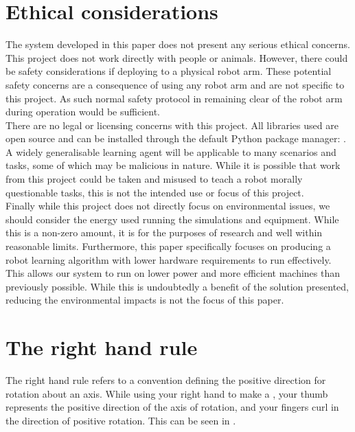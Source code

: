 \appendix
\chapter{Ethical considerations}
\label{apx:ethics}
The system developed in this paper does not present any serious ethical concerns.\\

This project does not work directly with people or animals. However, there could be safety considerations if deploying to a physical robot arm. These potential safety concerns are a consequence of using any robot arm and are not specific to this project. As such normal safety protocol in remaining clear of the robot arm during operation would be sufficient.\\

There are no legal or licensing concerns with this project. All libraries used are open source and can be installed through the default Python package manager: .\\

A widely generalisable learning agent will be applicable to many scenarios and tasks, some of which may be malicious in nature. While it is possible that work from this project could be taken and misused to teach a robot morally questionable tasks, this is not the intended use or focus of this project.\\

Finally while this project does not directly focus on environmental issues, we should consider the energy used running the simulations and equipment. While this is a non-zero amount, it is for the purposes of research and well within reasonable limits. Furthermore, this paper specifically focuses on producing a robot learning algorithm with lower hardware requirements to run effectively. This allows our system to run on lower power and more efficient machines than previously possible. While this is undoubtedly a benefit of the solution presented, reducing the environmental impacts is not the focus of this paper.


\chapter{The right hand rule}
\label{apx:right-hand-rule}
The right hand rule refers to a convention defining the positive direction for rotation about an axis. While using your right hand to make a , your thumb represents the positive direction of the axis of rotation, and your fingers curl in the direction of positive rotation. This can be seen in .\\

